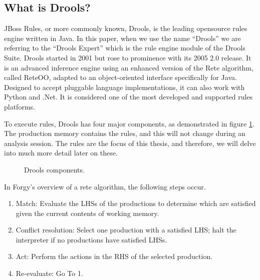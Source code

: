 \subsection{What is Drools?}\label{section:WhatIsDrools}

JBoss Rules, or more commonly known, Drools, is the leading opensource rules engine written in Java.
In this paper, when we use the name ``Drools'' we are referring to the ``Drools Expert'' which is the rule engine module of the Drools Suite.
Drools started in 2001 but rose to prominence with its 2005 2.0 release.
It is an advanced inference engine using an enhanced version of the Rete algorithm, called Rete\-OO\cite{sottara2010configurable}, adapted to an object-oriented interface specifically for Java.
Designed to accept pluggable language implementations, it can also work with Python and .Net.
It is considered one of the most developed and supported rules platforms.

To execute rules, Drools has four major components, as demonstrated in figure \ref{fig:Drools_components}.
The production memory contains the rules, and this will not change during an analysis session.
The rules are the focus of this thesis, and therefore, we will delve into much more detail later on these.

\begin{figure}[h]
    \centering
    \caption{Drools components.}
    \label{fig:Drools_components}
\end{figure}

In Forgy's\cite{forgy1989rete} overview of a rete algorithm, the following steps occur.
\begin{enumerate}
    \item Match: Evaluate the LHSs of the productions to determine which are satisfied given the current contents of working memory.
    \item Conflict resolution: Select one production with a satisfied LHS; halt the interpreter if no productions have satisfied LHSs.
    \item Act: Perform the actions in the RHS of the selected production.
    \item Re-evaluate: Go To 1.
\end{enumerate}

